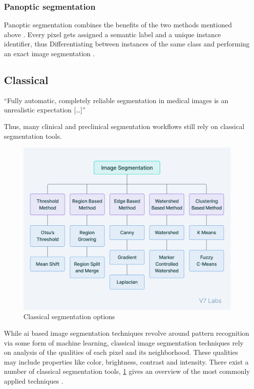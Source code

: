\subsubsection{Panoptic segmentation}
Panoptic segmentation combines the benefits of the two methods mentioned above
\cite{kirillovPanopticSegmentation2019}.
Every pixel gets assigned a semantic label and a unique instance identifier,
thus Differentiating between instances of the same class and performing an exact image segmentation
\cite{kirillovPanopticSegmentation2019}.

\subsection{Classical}\label{s:b-seg-techniques}
\begin{displayquote}
	``Fully automatic, completely reliable segmentation in medical images is an unrealistic expectation [\ldots]''
\end{displayquote}
Thus, many clinical and preclinical segmentation workflows still rely on classical segmentation tools.
\begin{figure}[h]
	\centerline{
		\includegraphics[scale=0.5]{images/classicalSegTree.png}}
	\caption{Classical segmentation options \cite{v7labsIntroductionImageSegmentation2021}}\label{fig:classicalSegTree}
\end{figure}
\noindent
While \acrshort{ai} based image segmentation techniques revolve around pattern recognition
via some form of machine learning,
classical image segmentation techniques rely on analysis of the qualities of each pixel and its neighborhood.
These qualities may include properties like color, brightness, contrast and intensity.
There exist a number of classical segmentation tools,
\cref{fig:classicalSegTree} gives an overview of the most commonly applied techniques
\cite{yuTechniquesChallengesImage2023,baliReviewStrategiesTechniques2015}.


